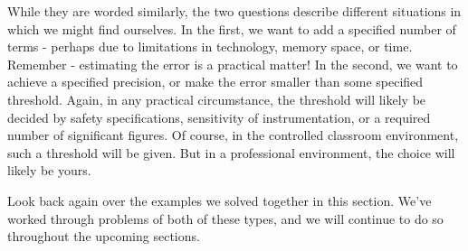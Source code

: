 \documentclass{ximera}
\begin{document}
While they are worded similarly, the two questions describe different situations in which we might find ourselves.  In the first, we want to add a specified number of terms - perhaps due to limitations in technology, memory space, or time.  Remember - estimating the error is a practical matter!  In the second, we want to achieve a specified precision, or make the error smaller than some specified threshold.  Again, in any practical circumstance, the threshold will likely be decided by safety specifications, sensitivity of instrumentation, or a required number of significant figures.  Of course, in the controlled classroom environment, such a threshold will be given.  But in a professional environment, the choice will likely be yours.

Look back again over the examples we solved together in this section.  We've worked through problems of both of these types, and we will continue to do so throughout the upcoming sections.
\end{document}
